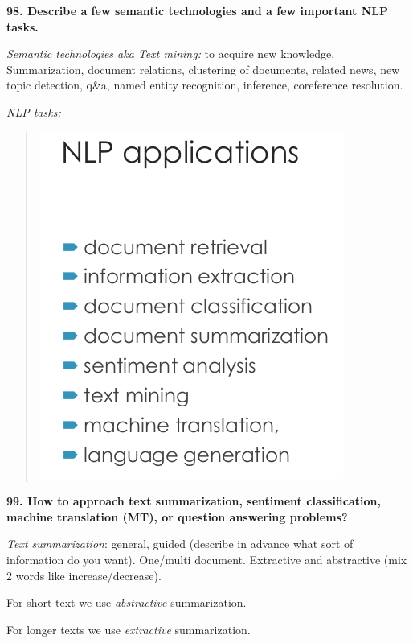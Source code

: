 \textbf{98. Describe a few semantic technologies and a few important NLP
tasks.}

\textit{Semantic technologies aka Text mining:} to acquire new
knowledge. Summarization, document relations, clustering of documents,
related news, new topic detection, q\&a, named entity recognition,
inference, coreference resolution.

\textit{NLP tasks:}

\begin{quote}
\includegraphics[width=\columnwidth]{media/image29.png}
\end{quote}

\textbf{99. How to approach text summarization, sentiment
classification, machine translation (MT), or question answering
problems?}

\textit{Text summarization}: general, guided (describe in advance
what sort of information do you want). One/multi document. Extractive
and abstractive (mix 2 words like increase/decrease).

For short text we use \emph{abstractive} summarization.

For longer texts we use \emph{extractive} summarization.

